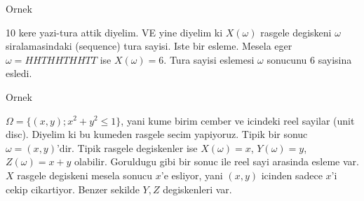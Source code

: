 \documentclass[12pt,fleqn]{article}
\begin{document}
Ornek

10 kere yazi-tura attik diyelim. VE yine diyelim ki $X(\omega)$ rasgele
degiskeni $\omega$ siralamasindaki (sequence) tura sayisi. Iste bir
esleme. Mesela eger $\omega = HHTHHTHHTT$ ise $X(\omega) = 6$. Tura sayisi
eslemesi $\omega$ sonucunu 6 sayisina esledi. 

Ornek 

$\Omega = \{ (x,y); x^2+y^2 \le 1 \}$, yani kume birim cember ve icindeki
reel sayilar (unit disc). Diyelim ki bu kumeden rasgele secim
yapiyoruz. Tipik bir sonuc $\omega = (x,y)$'dir. Tipik rasgele degiskenler
ise $X(\omega) = x$, $Y(\omega) = y$, $Z(\omega) = x+y$ olabilir. Goruldugu
gibi bir sonuc ile reel sayi arasinda esleme var. $X$ rasgele degiskeni
mesela sonucu $x$'e esliyor, yani $(x,y)$ icinden sadece $x$'i cekip
cikartiyor. Benzer sekilde $Y,Z$ degiskenleri var. 
\end{document}
